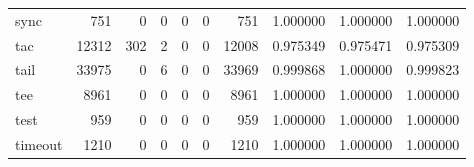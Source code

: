 \begin{tabular}{lrrrrrrrrr}
sync      &                                                751 &                                                  0 &                                                  0 &                                                  0 &                                                  0 &                                                751 &                                           1.000000 &                               1.000000 &                             1.000000 \\
tac       &                                              12312 &                                                302 &                                                  2 &                                                  0 &                                                  0 &                                              12008 &                                           0.975349 &                               0.975471 &                             0.975309 \\
tail      &                                              33975 &                                                  0 &                                                  6 &                                                  0 &                                                  0 &                                              33969 &                                           0.999868 &                               1.000000 &                             0.999823 \\
tee       &                                               8961 &                                                  0 &                                                  0 &                                                  0 &                                                  0 &                                               8961 &                                           1.000000 &                               1.000000 &                             1.000000 \\
test      &                                                959 &                                                  0 &                                                  0 &                                                  0 &                                                  0 &                                                959 &                                           1.000000 &                               1.000000 &                             1.000000 \\
timeout   &                                               1210 &                                                  0 &                                                  0 &                                                  0 &                                                  0 &                                               1210 &                                           1.000000 &                               1.000000 &                             1.000000 \\

\end{tabular}
